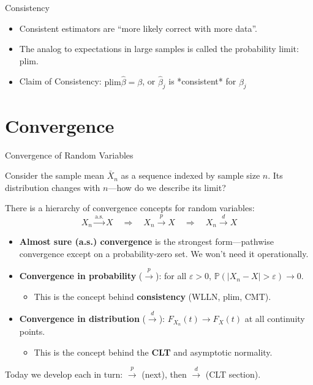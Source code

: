 \documentclass[handout, aspectratio=169]{beamer}
\numberwithin{equation}{section}
\begin{document}

\begin{frame}{Consistency}
\begin{itemize}
\item Consistent estimators are ``more likely correct with more data''.
\item The analog to expectations in large samples is called the probability limit: $\text{plim}$.
\item Claim of Consistency: $\text{plim}\hat{\beta}=\beta$, or $\hat{\beta}_j$ is *consistent* for $\beta_j$
\end{itemize}
\end{frame}

\section{Convergence}

\begin{frame}{Convergence of Random Variables}

Consider the sample mean $\bar{X}_n$ as a sequence indexed by sample size $n$. Its distribution changes with $n$---how do we describe its limit?

\pause
\vspace{0.5em}

There is a hierarchy of convergence concepts for random variables:
\[
X_n \overset{\text{a.s.}}{\longrightarrow} X
\quad \Rightarrow \quad
X_n \overset{p}{\longrightarrow} X
\quad \Rightarrow \quad
X_n \overset{d}{\longrightarrow} X
\]

\pause

\begin{itemize}
  \item \textbf{Almost sure (a.s.) convergence} is the strongest form---pathwise convergence except on a probability-zero set. We won't need it operationally.

  \item \textbf{Convergence in probability} ($\overset{p}{\to}$): for all $\varepsilon > 0$, $\mathbb{P}(|X_n - X| > \varepsilon) \to 0$.
  \begin{itemize}
    \item This is the concept behind \textbf{consistency} (WLLN, plim, CMT).
  \end{itemize}

  \item \textbf{Convergence in distribution} ($\overset{d}{\to}$): $F_{X_n}(t) \to F_X(t)$ at all continuity points.
  \begin{itemize}
    \item This is the concept behind the \textbf{CLT} and asymptotic normality.
  \end{itemize}
\end{itemize}

\pause
\vspace{0.3em}
Today we develop each in turn: $\overset{p}{\to}$ (next), then $\overset{d}{\to}$ (CLT section).

\end{frame}
\end{document}
